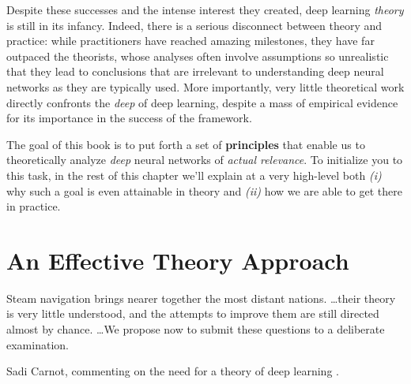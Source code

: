 Despite these successes and the intense interest they created, deep learning \emph{theory} is still in its infancy. 
Indeed, there is a serious disconnect between theory and practice: while practitioners have reached amazing milestones, they have far outpaced the theorists,
whose analyses often involve assumptions
so unrealistic that they lead to conclusions that are irrelevant to understanding deep neural networks as they are typically used. 
More importantly,
very little theoretical work directly confronts
the \emph{deep} of deep learning, despite a mass of empirical evidence for its importance in the success of the framework.






The goal of this book is to put forth
a set of \textbf{principles} that enable us to theoretically analyze \emph{deep} neural networks of \emph{actual relevance}.  
To initialize you to this task, in the rest of this chapter
we'll explain at a very high-level both \emph{(i)} why such a goal is even attainable in theory 
and \emph{(ii)} how we are able to get there in practice.











\section{An Effective Theory Approach}\label{sec:ET-approach}
\epigraph{Steam navigation brings nearer together the most distant nations. \ldots their theory is very little understood, and the attempts to improve them are still directed almost by chance. \ldots We propose now to submit these questions to a deliberate examination.}{Sadi Carnot, commenting on the need for a theory of deep learning \cite{carnot1890reflections}.}



